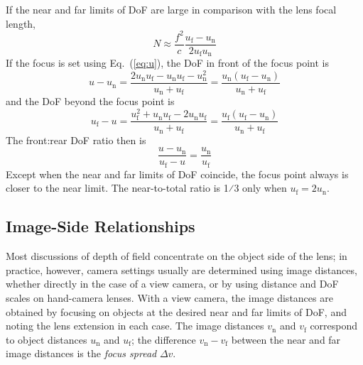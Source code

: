 \documentclass[11pt, oneside]{scrartcl}   	%
\newcommand{\Dv}{\ensuremath{\Delta v}}
\begin{document}
If the near and far limits of DoF are large in comparison with the lens focal length,
\begin{equation}
  \label{eq:Napprox}
  N\approx \frac{f^2}c\frac{u_\mathrm{f} - u_\mathrm{n}}{2u_\mathrm{f}u_\mathrm{n}}
\end{equation}
If the focus is set using Eq.~(\ref{eq:u}), the DoF in front of the
focus point is
\begin{equation}
  \label{eq:DOFf}
  u-u_\mathrm{n}=\frac{2u_\mathrm{n}u_\mathrm{f}-u_\mathrm{n}u_\mathrm{f}-u_\mathrm{n}^2}{u_\mathrm{n} + u_\mathrm{f}} = \frac{u_\mathrm{n}(u_\mathrm{f} - u_\mathrm{n})}{u_\mathrm{n} + u_\mathrm{f}}
\end{equation}
and the DoF beyond the focus point is
\begin{equation}
  \label{eq:DOFb}
  u_\mathrm{f} - u = \frac{u_\mathrm{f}^2 +u_\mathrm{n}u_\mathrm{f}-2u_\mathrm{n}u_\mathrm{f}}{u_\mathrm{n} + u_\mathrm{f}} = \frac{u_\mathrm{f}(u_\mathrm{f} - u_\mathrm{n})}{u_\mathrm{n} + u_\mathrm{f}}
\end{equation}
The front:rear DoF ratio then is
\begin{equation}
  \label{eq:frrat}
  \frac{u - u_\mathrm{n}}{u_\mathrm{f} - u} = \frac{u_\mathrm{n}}{u_\mathrm{f}}
\end{equation}
Except when the near and far limits of DoF coincide, the focus point always is closer to the
near limit. The near-to-total ratio is 1⁄3 only when $u_\mathrm{f} = 2u_\mathrm{n}$.

\subsection{Image-Side Relationships}
Most discussions of depth of field concentrate on the object side of the lens; in practice, however, camera settings usually are determined using image distances, whether directly in the case of a view camera, or by using distance and DoF scales on hand-camera lenses. With a view camera, the image distances are obtained by focusing on objects at the desired near and far limits of DoF, and noting the lens extension in each case. The image distances $v_\mathrm{n}$ and $v_\mathrm{f}$ correspond to object distances $u_\mathrm{n}$ and $u_\mathrm{f}$; the difference $v_\mathrm{n}-v_\mathrm{f}$ between the near and far image distances is the \emph{focus spread} $\Dv$.
\end{document}
